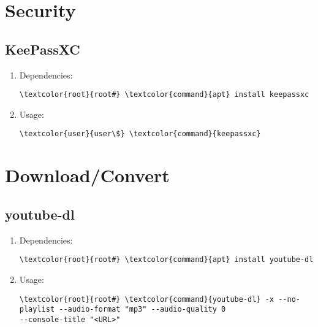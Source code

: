 \documentclass[10pt, a4paper, onecolumn, openany]{book} %
\begin{document}
\section{Security}
\subsection{KeePassXC}
\begin{enumerate}
    \item Dependencies:
\begin{Verbatim}[commandchars=\\\{\}]
\textcolor{root}{root#} \textcolor{command}{apt} install keepassxc
\end{Verbatim}
    \item Usage:
\begin{Verbatim}[commandchars=\\\{\}]
\textcolor{user}{user\$} \textcolor{command}{keepassxc}
\end{Verbatim}
\end{enumerate}
\section{Download/Convert}
\subsection{youtube-dl}
\begin{enumerate}
    \item Dependencies:
\begin{Verbatim}[commandchars=\\\{\}]
\textcolor{root}{root#} \textcolor{command}{apt} install youtube-dl
\end{Verbatim}
    \item Usage:
\begin{Verbatim}[commandchars=\\\{\}]
\textcolor{root}{root#} \textcolor{command}{youtube-dl} -x --no-playlist --audio-format "mp3" --audio-quality 0 
--console-title "<URL>"
\end{Verbatim}
\end{enumerate}
\end{document}
